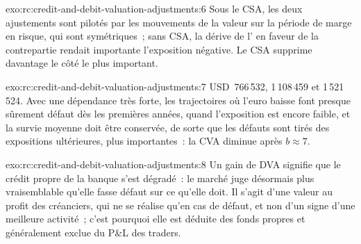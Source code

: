 \begin{solution}{exo:rc:credit-and-debit-valuation-adjustments:6}
Sous le CSA, les deux ajustements sont pilotés par les mouvements de la valeur sur la période de marge
en risque, qui sont symétriques~; sans CSA, la dérive de l' en faveur de la contrepartie
rendait importante l'exposition négative. Le CSA supprime davantage le côté le plus important.
\end{solution}

\begin{solution}{exo:rc:credit-and-debit-valuation-adjustments:7}
USD~766\,532, 1\,108\,459 et 1\,521\,524. Avec une dépendance très forte, les trajectoires où l'euro baisse
font presque sûrement défaut dès les premières années, quand l'exposition est encore faible, et la
survie moyenne doit être conservée, de sorte que les défauts sont tirés des expositions ultérieures, plus importantes~: la
CVA diminue après $b\approx7$.
\end{solution}

\begin{solution}{exo:rc:credit-and-debit-valuation-adjustments:8}
Un gain de DVA signifie que le crédit propre de la banque s'est dégradé~: le marché juge désormais plus vraisemblable qu'elle fasse défaut
sur ce qu'elle doit. Il s'agit d'une valeur au profit des créanciers, qui ne se réalise qu'en cas de défaut, et non d'un signe d'une meilleure
activité~; c'est pourquoi elle est déduite des fonds propres et généralement exclue du P\&L des traders.
\end{solution}

